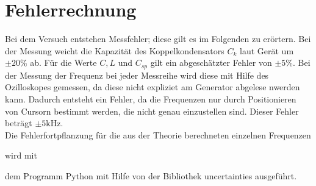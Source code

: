 \section{Fehlerrechnung}
 \label{fehlerrechnung}
Bei dem Versuch entstehen Messfehler;
diese gilt es im Folgenden zu erörtern.
Bei der Messung weicht die Kapazität des Koppelkondensators $C_k$ laut Gerät um $\pm 20 \%$ ab. Für die Werte $C,L $ und $C_{sp}$ gilt
ein abgeschätzter Fehler von  $\pm 5\si{\percent}$.
Bei der Messung der Frequenz bei jeder Messreihe
wird diese mit Hilfe des Ozilloskopes gemessen,
da diese nicht expliziet am Generator abgelese nwerden kann.
Dadurch entsteht ein Fehler, da die Frequenzen
nur durch Positionieren von Cursorn bestimmt werden,
die nicht genau einzustellen sind. Dieser Fehler beträgt $\pm 5 \si{\kilo\hertz}$.
\\
Die Fehlerfortpflanzung für die aus der Theorie berechneten einzelnen Frequenzen

 wird mit%

 dem Programm Python mit Hilfe von der Bibliothek uncertainties ausgeführt.
